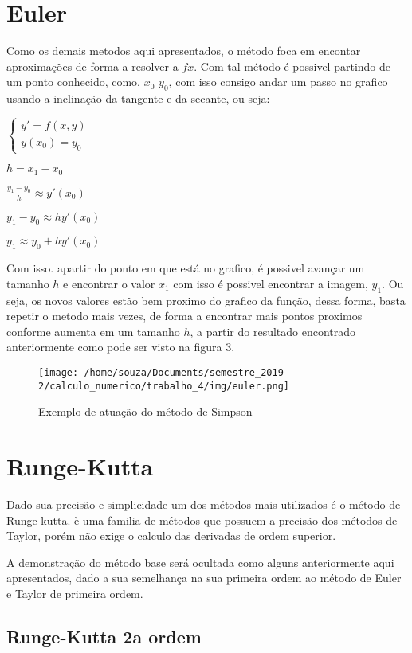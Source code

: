 \documentclass[12pt]{article}
\begin{document}
\section{Euler}


Como os demais metodos aqui apresentados, o método foca em encontar aproximações de forma a resolver a $fx$. Com tal método é possivel partindo de um ponto conhecido, como, $x_{0}$ $y_{0}$, com isso consigo andar um passo no grafico usando a inclinação da tangente e da secante, ou seja:

$\left \{ \begin{matrix} y' = f(x,y) & \mbox{ }\mbox{ }\\ y(x_{0}) = y_{0} & \mbox{ }\mbox{} \end{matrix} \right.$ 


$h = x_{1} - x_{0}$

$\frac{y_{1} - y_{0}}{h} \approx y'(x_{0})$

$y_{1} - y_{0} \approx hy'(x_{0})$

$y_{1} \approx y_{0} + hy'(x_{0})$

Com isso. apartir do ponto em que está no grafico, é possivel avançar um tamanho $h$ e encontrar o valor $x_{1}$ com isso é possivel encontrar a imagem, $y_{1}$. Ou seja, os novos valores estão bem proximo do grafico da função, dessa forma, basta repetir o metodo mais vezes, de forma a encontrar mais pontos proximos conforme aumenta em um tamanho $h$, a partir do resultado encontrado anteriormente como pode ser visto na figura 3.

\begin{figure}[!h]
    \centering
    \texttt{[image: /home/souza/Documents/semestre\_2019-2/calculo\_numerico/trabalho\_4/img/euler.png]}
    \caption{Exemplo de atuação do método de Simpson}
\end{figure}

\section{Runge-Kutta}
Dado sua precisão e simplicidade um dos métodos mais utilizados é o método de Runge-kutta. è uma familia de métodos que possuem a precisão dos métodos de Taylor, porém não exige o calculo das derivadas de ordem superior.

A demonstração do método base será ocultada como alguns anteriormente aqui apresentados, dado a sua semelhança na sua primeira ordem ao método de Euler e Taylor de primeira ordem.

\subsection{Runge-Kutta 2a ordem}
\end{document}
